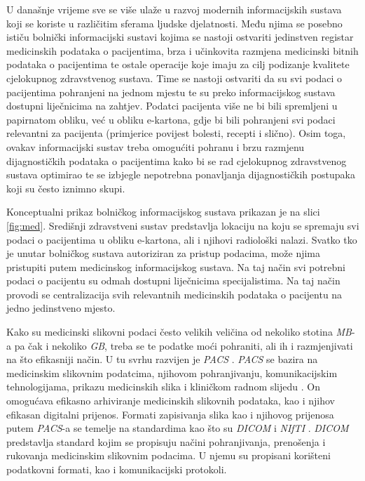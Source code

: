 \documentclass[times, utf8, zavrsni, numeric, sort]{fer}
\begin{document}
U današnje vrijeme sve se više ulaže u razvoj modernih informacijskih sustava koji se koriste u različitim sferama ljudske djelatnosti. Među njima se posebno ističu bolnički informacijski sustavi kojima se nastoji ostvariti jedinstven registar medicinskih podataka o pacijentima, brza i učinkovita razmjena medicinski bitnih podataka o pacijentima te ostale operacije koje imaju za cilj podizanje kvalitete cjelokupnog zdravstvenog sustava. Time se nastoji ostvariti da su svi podaci o pacijentima pohranjeni na jednom mjestu te su preko informacijskog sustava dostupni liječnicima na zahtjev. Podatci pacijenta više ne bi bili spremljeni u papirnatom obliku, već u obliku e-kartona, gdje bi bili pohranjeni svi podaci relevantni za pacijenta (primjerice povijest bolesti, recepti i slično). Osim toga, ovakav informacijski sustav treba omogućiti pohranu i brzu razmjenu dijagnostičkih podataka o pacijentima kako bi se rad cjelokupnog zdravstvenog sustava optimirao te se izbjegle nepotrebna ponavljanja dijagnostičkih postupaka koji su često iznimno skupi.

Konceptualni prikaz bolničkog informacijskog sustava prikazan je na slici \ref{fig:med}. Središnji zdravstveni sustav predstavlja lokaciju na koju se spremaju svi podaci o pacijentima u obliku e-kartona, ali i njihovi radiološki nalazi. Svatko tko je unutar bolničkog sustava autoriziran za pristup podacima, može njima pristupiti putem medicinskog informacijskog sustava. Na taj način svi potrebni podaci o pacijentu su odmah dostupni liječnicima specijalistima. Na taj način provodi se centralizacija svih relevantnih medicinskih podataka o pacijentu na jedno jedinstveno mjesto.

Kako su medicinski slikovni podaci često velikih veličina od nekoliko stotina \emph{MB}-a pa čak i nekoliko \emph{GB}, treba se te podatke moći pohraniti, ali ih i razmjenjivati na što efikasniji način. U tu svrhu razvijen je \emph{PACS} . \emph{PACS} se bazira na medicinskim slikovnim podatcima, njihovom pohranjivanju, komunikacijskim tehnologijama, prikazu medicinskih slika i kliničkom radnom slijedu \cite{Huang:11}. On omogućava efikasno arhiviranje medicinskih slikovnih podataka, kao i njihov efikasan digitalni prijenos. Formati zapisivanja slika kao i njihovog prijenosa putem \emph{PACS}-a se temelje na standardima kao što su \emph{DICOM}\cite{dicom}  i \emph{NIfTI} \cite{nifti} . \emph{DICOM} predstavlja standard kojim se propisuju načini pohranjivanja, prenošenja i rukovanja medicinskim slikovnim podacima. U njemu su propisani korišteni podatkovni formati, kao i komunikacijski protokoli.
\end{document}
